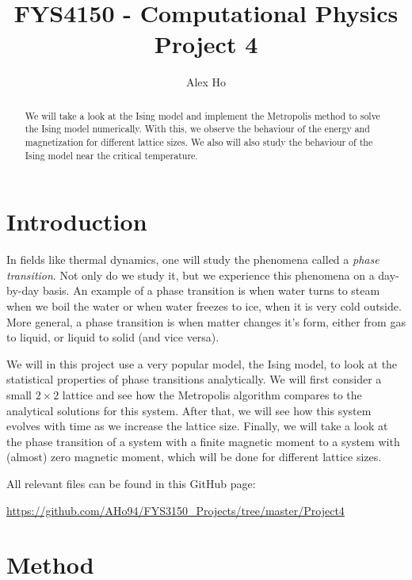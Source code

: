 \documentclass[12pt]{article}
\author{Alex Ho}
\title{FYS4150 - Computational Physics \\ Project 4}
\begin{document}
\maketitle
\begin{abstract}
We will take a look at the Ising model and implement the Metropolis method to solve the Ising model numerically. With this, we observe the behaviour of the energy and magnetization for different lattice sizes. We also will also study the behaviour of the Ising model near the critical temperature.
\end{abstract}
\newpage
\tableofcontents
\newpage
\section{Introduction} \label{section:intro}
In fields like thermal dynamics, one will study the phenomena called a \emph{phase transition}. Not only do we study it, but we experience this phenomena on a day-by-day basis. An example of a phase transition is when water turns to steam when we boil the water or when water freezes to ice, when it is very cold outside. More general, a phase transition is when matter changes it's form, either from gas to liquid, or liquid to solid (and vice versa).

We will in this project use a very popular model, the Ising model, to look at the statistical properties of phase transitions analytically. We will first consider a small $2\times 2$ lattice and see how the Metropolis algorithm compares to the analytical solutions for this system. After that, we will see how this system evolves with time as we increase the lattice size. Finally, we will take a look at the phase transition of a system with a finite magnetic moment to a system with (almost) zero magnetic moment, which will be done for different lattice sizes.

All relevant files can be found in this GitHub page:

\url{https://github.com/AHo94/FYS3150_Projects/tree/master/Project4}

\section{Method} \label{section:methods}
\end{document}
